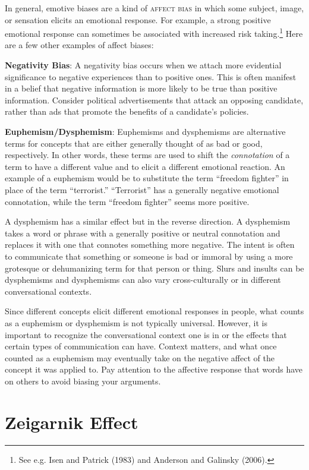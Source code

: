 In general, emotive biases are a kind of \textsc{\gls{affect bias}} in which some subject, image, or sensation elicits an emotional response. For example, a strong positive emotional response can sometimes be associated with increased risk taking.\footnote{See e.g. Isen and Patrick (1983) and Anderson and Galinsky (2006).} Here are a few other examples of affect biases:

\textbf{Negativity Bias}: A negativity bias occurs when we attach more evidential significance to negative experiences than to positive ones. This is often manifest in  a belief that negative information is more likely to be true than positive information. Consider political advertisements that attack an opposing candidate, rather than ads that promote the benefits of a candidate's policies.

\textbf{Euphemism/Dysphemism}: Euphemisms and dysphemisms are alternative terms for concepts that are either generally thought of as bad or good, respectively. In other words, these terms are used to shift the \emph{connotation} of a term to have a different value and to elicit a different emotional reaction. An example of a euphemism would be to substitute the term ``freedom fighter'' in place of the term ``terrorist.'' ``Terrorist'' has a generally negative emotional connotation, while the term ``freedom fighter'' seems more positive. 

A dysphemism has a similar effect but in the reverse direction. A dysphemism takes a word or phrase with a generally positive or neutral connotation and replaces it with one that connotes something more negative. The intent is often to communicate that something or someone is bad or immoral by using a more grotesque or dehumanizing term for that person or thing. Slurs and insults can be dysphemisms and dysphemisms can also vary cross-culturally or in different conversational contexts.

Since different concepts elicit different emotional responses in people, what counts as a euphemism or dysphemism is not typically universal. However, it is important to recognize the conversational context one is in or the effects that certain types of communication can have. Context matters, and what once counted as a euphemism may eventually take on the negative affect of the concept it was applied to. Pay attention to the affective response that words have on others to avoid biasing your arguments.

\section{Zeigarnik Effect}

